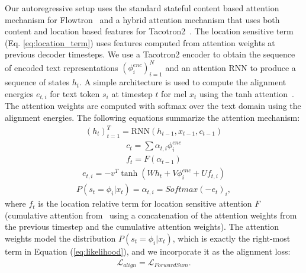 Our autoregressive setup uses the standard stateful content based attention mechanism for Flowtron~\cite{Flowtron} and a hybrid attention mechanism that uses both content and location based features for Tacotron2~\cite{Tacotron2}. 
The location sensitive term (Eq. \ref{eq:location_term}) uses features computed from attention weights at previous decoder timesteps. 
We use a Tacotron2 encoder to obtain the sequence of encoded text representations $(\phi_i^{enc})_{i=1}^{N}$ and an attention RNN to produce a sequence of states $h_t$. A simple architecture is used to compute the alignment energies $e_{t, i}$ for text token $s_i$ at timestep $t$ for mel $x_t$ using the tanh attention~\cite{bahdanau2014neural}. The attention weights are computed with softmax over the text domain using the alignment energies. The following equations summarize the attention mechanism:
%
\begin{equation}
  \begin{aligned}
     (h_{{t}})_{t=1}^{T} = \text{RNN}(h_{t-1}, x_{t-1}, c_{t-1})
   \end{aligned}
\end{equation}
%
\begin{equation}
  \begin{aligned}
     c_{t} = \sum \alpha_{t, i}  \phi^{enc}_i 
   \end{aligned}
\end{equation}
%
\begin{equation}\label{eq:location_term}
  \begin{aligned}
     f_t = F (\alpha_{t-1})
   \end{aligned}
\end{equation}
%
\begin{equation}
  \begin{aligned}
     e_{t, i} = -v^{T} \tanh ( Wh_{t} + V\phi_i^{enc} + Uf_{t, i})
   \end{aligned}
\end{equation}
%
\begin{equation}
  \begin{aligned}
     P(s_t = \phi_i | x_t)= \alpha_{t, i} = Softmax(- e_t)_i,
   \end{aligned}
\end{equation}
%
where $f_t$ is the location relative term for location sensitive attention $F$ (cumulative attention from~\cite{Tacotron2} using a concatenation of the attention weights from the previous timestep and the cumulative attention weights). 
The attention weights model the distribution $P(s_t = \phi_i | x_t)$, which is exactly the right-most term in Equation (\ref{eq:likelihood}), and we incorporate it as the alignment loss:
\begin{equation}
  \begin{aligned}
     \mathcal{L}_{\mathit{align}} = \mathcal{L}_{\mathit{ForwardSum}}.
   \end{aligned}
\end{equation}

